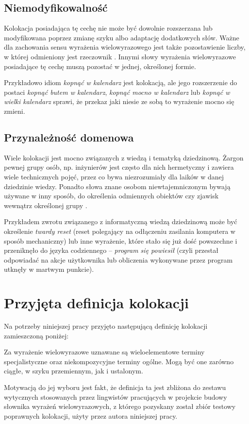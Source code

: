 \subsection{Niemodyfikowalność}
Kolokacja posiadająca tę cechę nie może być dowolnie rozszerzana lub modyfikowana poprzez zmianę szyku albo adaptację dodatkowych słów.
Ważne dla zachowania sensu wyrażenia wielowyrazowego jest także pozostawienie liczby, w której odmieniony jest rzeczownik \cite[str 184]{mit}.
Innymi słowy wyrażenia wielowyrazowe posiadające tę cechę muszą pozostać w jednej, określonej formie.
\par
Przykładowo idiom \emph{kopnąć w kalendarz} jest kolokacją, ale jego rozszerzenie do postaci \emph{kopnąć butem w kalendarz}, \emph{kopnąć mocno w kalendarz} lub \emph{kopnąć w wielki kalendarz} sprawi, że przekaz jaki niesie ze sobą to wyrażenie mocno się zmieni.


\subsection{Przynależność domenowa}
Wiele kolokacji jest mocno związanych z wiedzą i tematyką dziedzinową.
Żargon pewnej grupy osób, np. inżynierów jest często dla nich hermetyczny i zawiera wiele technicznych pojęć, przez co bywa niezrozumiały dla laików w danej dziedzinie wiedzy.
Ponadto słowa znane osobom niewtajemniczonym bywają używane w inny sposób, do określenia odmiennych obiektów czy zjawisk wewnątrz określonej grupy \cite[str. 4]{smadja_xtract}. 
\par
Przykładem zwrotu związanego z informatyczną wiedzą dziedzinową może być określenie \emph{twardy reset} (reset polegający na odłączeniu zasilania komputera w sposób mechaniczny) lub inne wyrażenie, które stało się już dość powszechne i przeniknęło do języka codziennego -- \emph{program się powiesił} (czyli przestał odpowiadać na akcje użytkownika lub obliczenia wykonywane przez program utknęły w martwym punkcie).

	

\section{Przyjęta definicja kolokacji}
Na potrzeby niniejszej pracy przyjęto następującą definicję kolokacji zamieszczoną poniżej:
\begin{center}
Za wyrażenie wielowyrazowe uznawane są wieloelementowe terminy specjalistyczne oraz niekompozycyjne terminy ogólne.
Mogą być one zarówno ciągłe, w szyku przemiennym, jak i ustalonym.
\end{center}

Motywacją do jej wyboru jest fakt, że definicja ta jest zbliżona do zestawu wytycznych stosowanych przez lingwistów pracujących w projekcie budowy słownika wyrażeń wielowyrazowych, z którego pozyskany został zbiór testowy poprawnych kolokacji, użyty przez autora niniejszej pracy.
